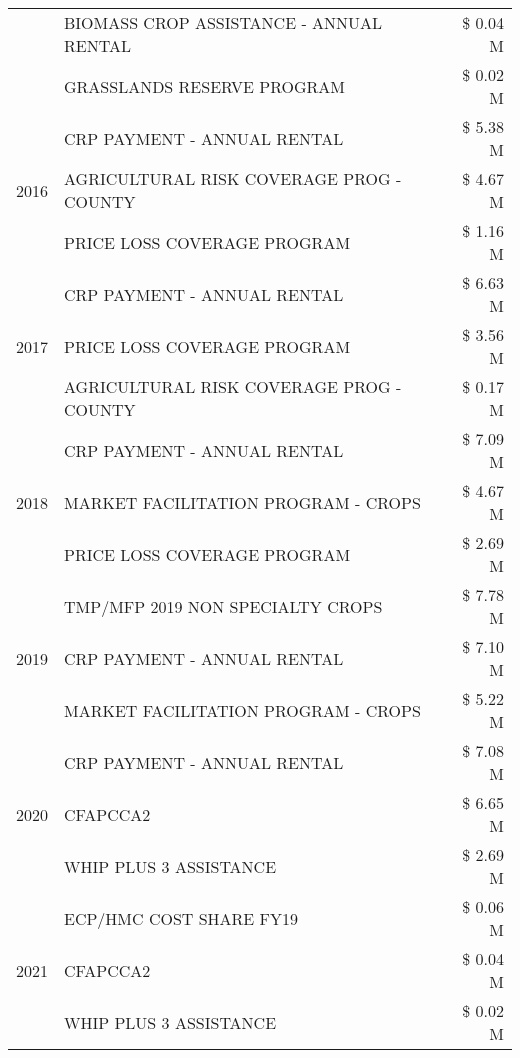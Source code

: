 \begin{tabular}{llr}
 & BIOMASS CROP ASSISTANCE - ANNUAL RENTAL & \$ 0.04 M \\
 & GRASSLANDS RESERVE PROGRAM & \$ 0.02 M \\
\cline{1-3}
\multirow[t]{3}{*}{2016} & CRP PAYMENT - ANNUAL RENTAL & \$ 5.38 M \\
 & AGRICULTURAL RISK COVERAGE PROG - COUNTY & \$ 4.67 M \\
 & PRICE LOSS COVERAGE PROGRAM & \$ 1.16 M \\
\cline{1-3}
\multirow[t]{3}{*}{2017} & CRP PAYMENT - ANNUAL RENTAL & \$ 6.63 M \\
 & PRICE LOSS COVERAGE PROGRAM & \$ 3.56 M \\
 & AGRICULTURAL RISK COVERAGE PROG - COUNTY & \$ 0.17 M \\
\cline{1-3}
\multirow[t]{3}{*}{2018} & CRP PAYMENT - ANNUAL RENTAL & \$ 7.09 M \\
 & MARKET FACILITATION PROGRAM - CROPS & \$ 4.67 M \\
 & PRICE LOSS COVERAGE PROGRAM & \$ 2.69 M \\
\cline{1-3}
\multirow[t]{3}{*}{2019} & TMP/MFP 2019 NON SPECIALTY CROPS & \$ 7.78 M \\
 & CRP PAYMENT - ANNUAL RENTAL & \$ 7.10 M \\
 & MARKET FACILITATION PROGRAM - CROPS & \$ 5.22 M \\
\cline{1-3}
\multirow[t]{3}{*}{2020} & CRP PAYMENT - ANNUAL RENTAL & \$ 7.08 M \\
 & CFAPCCA2 & \$ 6.65 M \\
 & WHIP PLUS 3 ASSISTANCE & \$ 2.69 M \\
\cline{1-3}
\multirow[t]{3}{*}{2021} & ECP/HMC COST SHARE FY19 & \$ 0.06 M \\
 & CFAPCCA2 & \$ 0.04 M \\
 & WHIP PLUS 3 ASSISTANCE & \$ 0.02 M \\
\cline{1-3}
\bottomrule
\end{tabular}
